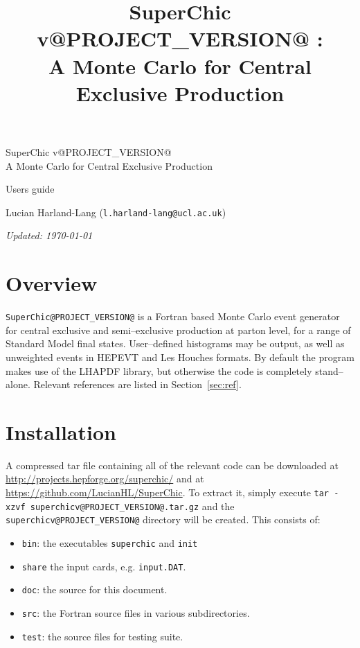 \documentclass[12pt]{article}
\title{SuperChic v@PROJECT_VERSION@ : \\ \vspace{0.5cm}A Monte Carlo for Central Exclusive Production}
\begin{document}
\begin{titlepage}
\begin{center}

{\huge SuperChic v@PROJECT_VERSION@} \\ \vspace{0.5cm} {\Large A Monte Carlo for Central Exclusive Production}

\vspace{3cm}

{\huge Users guide}

\vspace{3cm}

\large{ Lucian Harland-Lang (\texttt{l.harland-lang@ucl.ac.uk})}

\vspace{3cm}
{\small \emph{Updated: \today}}

\end{center}
\end{titlepage}

\clearpage

\tableofcontents

\clearpage

\section{Overview}

\texttt{SuperChic@PROJECT_VERSION@} is a Fortran based Monte Carlo event 
generator for central exclusive and semi--exclusive production at parton 
level, for a range of Standard Model final states. User--defined 
histograms may be output, as well as unweighted events in HEPEVT and 
Les Houches formats. By default the program makes use of the LHAPDF 
library, but otherwise the code is completely stand--alone. Relevant 
references are listed in Section~\ref{sec:ref}.

\section{Installation}

A compressed tar file containing all of the relevant code can be 
downloaded at \url{http://projects.hepforge.org/superchic/} and at 
\url{https://github.com/LucianHL/SuperChic}. To 
extract it, simply execute \texttt{tar -xzvf 
superchicv@PROJECT_VERSION@.tar.gz} and the 
\texttt{superchicv@PROJECT_VERSION@} directory will be created. 
This consists of:
%
\begin{itemize}
\item \texttt{bin}: the executables \texttt{superchic} and \texttt{init} 
\item \texttt{share} the input cards, e.g. \texttt{input.DAT}.
\item \texttt{doc}: the source for this document.
\item \texttt{src}: the Fortran source files in various subdirectories.
\item \texttt{test}: the source files for testing suite.
\end{itemize}
\end{document}
